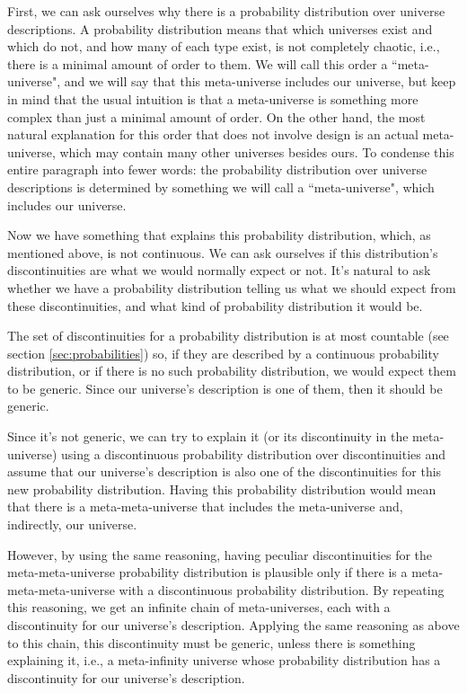 \documentclass[a4paper
,draft
]{article}
\newcommand{\ghilimele}[1]{``#1"}
\begin{document}
First, we can ask ourselves why there is a probability distribution over
universe descriptions.
A probability distribution means that which universes exist and which do not,
and how many of each type exist, is not completely chaotic,
i.e., there is a minimal amount of order to them.
We will call this order a \ghilimele{meta-universe}, and we will say that
this meta-universe includes our universe, but keep in mind that the usual
intuition is that a meta-universe is something more complex than just
a minimal amount of order.
On the other hand, the most natural explanation for this order
that does not involve design is an actual
meta-universe, which may contain many other universes besides ours.
To condense this entire paragraph into fewer words: the probability distribution over
universe descriptions is determined by something we will call
a \ghilimele{meta-universe}, which includes our universe.

Now we have something that explains this probability distribution, which,
as mentioned above, is not continuous.
We can ask ourselves if this distribution's discontinuities are what
we would normally expect or not.
It's natural to ask whether we have a probability distribution telling us
what we should expect from these discontinuities, and what kind of probability
distribution it would be.

The set of discontinuities for a probability distribution is at most countable
(see section \ref{sec:probabilities}) so, if they are described by a
continuous probability
distribution, or if there is no such probability distribution, we would
expect them to be generic.
Since our universe's description is one of them, then it should be generic.

Since it's not generic, we can try to explain it (or its discontinuity
in the meta-universe)
using a discontinuous probability distribution over discontinuities
and assume that our universe's description is also one of the
discontinuities for this new probability distribution.
Having this probability distribution would mean that there is
a meta-meta-universe that includes the meta-universe and, indirectly,
our universe.

However, by using the same reasoning, having peculiar discontinuities for the
meta-meta-universe probability
distribution is plausible only if there is a meta-meta-meta-universe
with a discontinuous probability distribution.
By repeating this reasoning, we get an infinite chain of meta-universes,
each with a discontinuity for our universe's
description.
Applying the same reasoning as above to this chain, this discontinuity
must be generic,
unless there is something explaining it, i.e., a meta-infinity universe
whose probability distribution has a discontinuity for our universe's
description.
\end{document}
